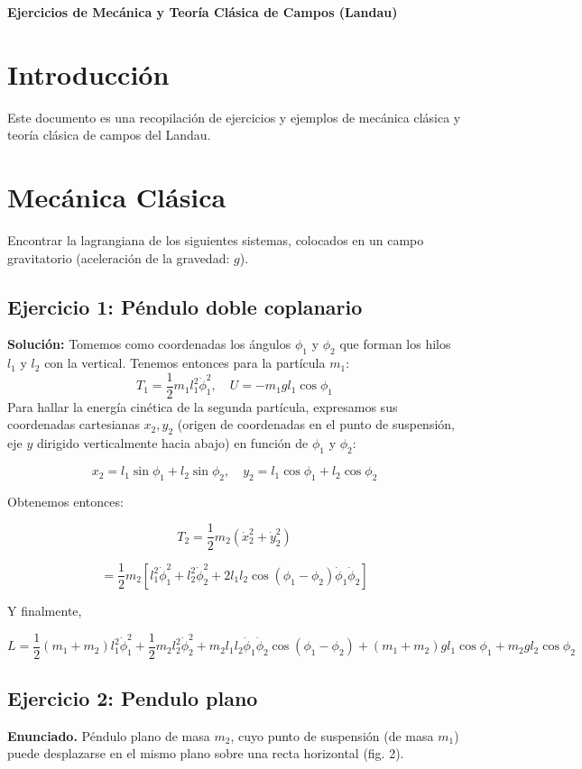 \documentclass[12pt]{article}
\begin{document}
\textbf{Ejercicios de Mecánica y Teoría Clásica de Campos (Landau)}

\section{Introducción}
Este documento es una recopilación de ejercicios y ejemplos de mecánica clásica y teoría clásica de campos del Landau.

\section{Mecánica Clásica}
Encontrar la lagrangiana de los siguientes sistemas, colocados en un campo gravitatorio (aceleración de la gravedad: $g$).
\subsection{Ejercicio 1: Péndulo doble coplanario}
\textbf{Solución:} Tomemos como coordenadas los ángulos $\phi_1$ y $\phi_2$ que forman los hilos $l_1$ y $l_2$ con la vertical. Tenemos entonces para la partícula $m_1$:
$$
T_1 = \frac{1}{2} m_1 l_1^2 \dot{\phi}_1^2, \quad U = -m_1 g l_1 \cos \phi_1
$$
Para hallar la energía cinética de la segunda partícula, expresamos sus coordenadas cartesianas $x_2, y_2$ (origen de coordenadas en el punto de suspensión, eje $y$ dirigido verticalmente hacia abajo) en función de $\phi_1$ y $\phi_2$:

$$
x_2 = l_1 \sin \phi_1 + l_2 \sin \phi_2, \quad y_2 = l_1 \cos \phi_1 + l_2 \cos \phi_2
$$

Obtenemos entonces:

$$
T_2 = \frac{1}{2} m_2 (\dot{x}_2^2 + \dot{y}_2^2)
$$

$$
= \frac{1}{2} m_2 [l_1^2 \dot{\phi}_1^2 + l_2^2 \dot{\phi}_2^2 + 2 l_1 l_2 \cos(\phi_1 - \phi_2) \dot{\phi}_1 \dot{\phi}_2]
$$

Y finalmente,

$$
L = \frac{1}{2} (m_1 + m_2) l_1^2 \dot{\phi}_1^2 + \frac{1}{2} m_2 l_2^2 \dot{\phi}_2^2 + m_2 l_1 l_2 \dot{\phi}_1 \dot{\phi}_2 \cos(\phi_1 - \phi_2) + (m_1 + m_2) g l_1 \cos \phi_1 + m_2 g l_2 \cos \phi_2
$$

\subsection{Ejercicio 2: Pendulo plano}
\textbf{Enunciado.}  Péndulo plano de masa $m_2$, cuyo punto de suspensión (de masa $m_1$) puede desplazarse en el mismo plano sobre una recta horizontal (fig. 2).
\end{document}
